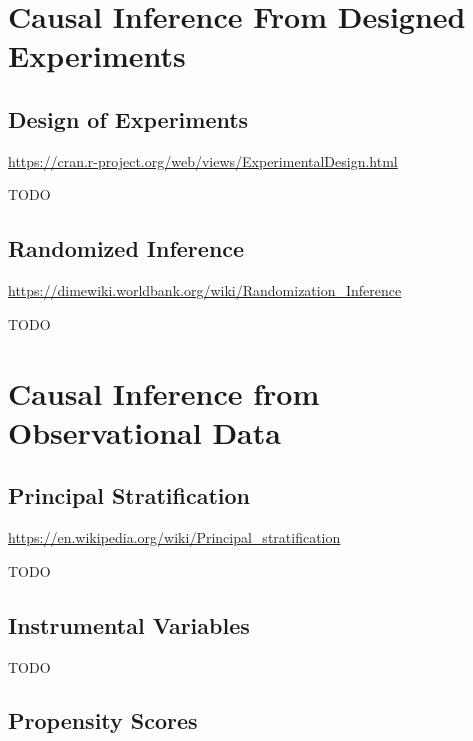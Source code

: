 \documentclass[]{book}
\theoremstyle{definition}
\theoremstyle{definition}
\theoremstyle{definition}
\theoremstyle{remark}
\begin{document}
\hypertarget{causal-inference-from-designed-experiments}{%
\section{Causal Inference From Designed Experiments}\label{causal-inference-from-designed-experiments}}

\hypertarget{design-of-experiments}{%
\subsection{Design of Experiments}\label{design-of-experiments}}

\url{https://cran.r-project.org/web/views/ExperimentalDesign.html}

TODO

\hypertarget{randomized-inference}{%
\subsection{Randomized Inference}\label{randomized-inference}}

\url{https://dimewiki.worldbank.org/wiki/Randomization_Inference}

TODO

\hypertarget{causal-inference-from-observational-data}{%
\section{Causal Inference from Observational Data}\label{causal-inference-from-observational-data}}

\hypertarget{principal-stratification}{%
\subsection{Principal Stratification}\label{principal-stratification}}

\citet{frumento2012evaluating}

\url{https://en.wikipedia.org/wiki/Principal_stratification}

TODO

\hypertarget{instrumental-variables}{%
\subsection{Instrumental Variables}\label{instrumental-variables}}

TODO

\hypertarget{propensity-scores}{%
\subsection{Propensity Scores}\label{propensity-scores}}
\end{document}
